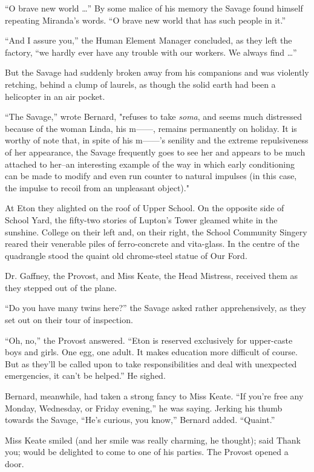 \documentclass[12pt]{report}
\begin{document}
``O brave new world \ldots{}'' By some malice of his memory the Savage
found himself repeating Miranda's words. ``O brave new world that has
such people in it.''

``And I assure you,'' the Human Element Manager concluded, as they left
the factory, ``we hardly ever have any trouble with our workers. We
always find \ldots{}''

But the Savage had suddenly broken away from his companions and was
violently retching, behind a clump of laurels, as though the solid earth
had been a helicopter in an air pocket.

``The Savage,'' wrote Bernard, "refuses to take \emph{soma}, and seems
much distressed because of the woman Linda, his m------, remains
permanently on holiday. It is worthy of note that, in spite of his
m------'s senility and the extreme repulsiveness of her appearance, the
Savage frequently goes to see her and appears to be much attached to
her--an interesting example of the way in which early conditioning can
be made to modify and even run counter to natural impulses (in this
case, the impulse to recoil from an unpleasant object)."

At Eton they alighted on the roof of Upper School. On the opposite side
of School Yard, the fifty-two stories of Lupton's Tower gleamed white in
the sunshine. College on their left and, on their right, the School
Community Singery reared their venerable piles of ferro-concrete and
vita-glass. In the centre of the quadrangle stood the quaint old
chrome-steel statue of Our Ford.

Dr. Gaffney, the Provost, and Miss Keate, the Head Mistress, received
them as they stepped out of the plane.

``Do you have many twins here?'' the Savage asked rather apprehensively,
as they set out on their tour of inspection.

``Oh, no,'' the Provost answered. ``Eton is reserved exclusively for
upper-caste boys and girls. One egg, one adult. It makes education more
difficult of course. But as they'll be called upon to take
responsibilities and deal with unexpected emergencies, it can't be
helped.'' He sighed.

Bernard, meanwhile, had taken a strong fancy to Miss Keate. ``If you're
free any Monday, Wednesday, or Friday evening,'' he was saying. Jerking
his thumb towards the Savage, ``He's curious, you know,'' Bernard added.
``Quaint.''

Miss Keate smiled (and her smile was really charming, he thought); said
Thank you; would be delighted to come to one of his parties. The Provost
opened a door.
\end{document}
